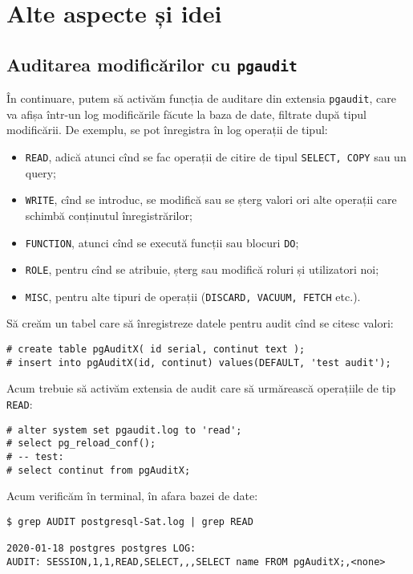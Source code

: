 \chapter{Alte aspecte și idei}

\section{Auditarea modificărilor cu \texttt{pgaudit}}

În continuare, putem să activăm funcția de auditare din extensia
\texttt{pgaudit}, care va afișa într-un log modificările făcute la baza de
date, filtrate după tipul modificării. De exemplu, se pot înregistra în
log operații de tipul:
\begin{itemize}
\item \texttt{READ}, adică atunci cînd se fac operații de citire de tipul
  \texttt{SELECT, COPY} sau un query;
\item \texttt{WRITE}, cînd se introduc, se modifică sau se șterg valori ori
  alte operații care schimbă conținutul înregistrărilor;
\item \texttt{FUNCTION}, atunci cînd se execută funcții sau blocuri \texttt{DO};
\item \texttt{ROLE}, pentru cînd se atribuie, șterg sau modifică roluri și
  utilizatori noi;
\item \texttt{MISC}, pentru alte tipuri de operații
  (\texttt{DISCARD, VACUUM, FETCH} etc.).
\end{itemize}

Să creăm un tabel care să înregistreze datele pentru audit cînd se citesc valori:
{
  \small
\begin{verbatim}
# create table pgAuditX( id serial, continut text );
# insert into pgAuditX(id, continut) values(DEFAULT, 'test audit');
\end{verbatim}
}

Acum trebuie să activăm extensia de audit care să urmărească operațiile de tip
\texttt{READ}:
{
  \small
\begin{verbatim}
# alter system set pgaudit.log to 'read';
# select pg_reload_conf();
# -- test:
# select continut from pgAuditX;
\end{verbatim}
}

Acum verificăm în terminal, în afara bazei de date:
{
  \small
\begin{verbatim}
$ grep AUDIT postgresql-Sat.log | grep READ

2020-01-18 postgres postgres LOG: 
AUDIT: SESSION,1,1,READ,SELECT,,,SELECT name FROM pgAuditX;,<none>
\end{verbatim}
}

